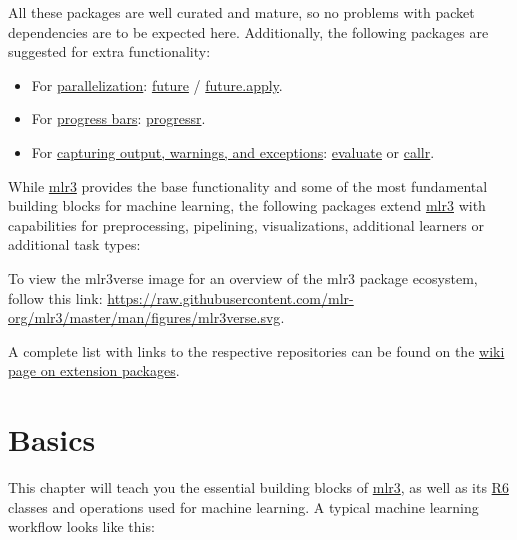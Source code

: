 \documentclass[
]{scrbook}
\providecommand{\tightlist}{%
  \setlength{\itemsep}{0pt}\setlength{\parskip}{0pt}}
\begin{document}
All these packages are well curated and mature, so no problems with packet dependencies are to be expected here.
Additionally, the following packages are suggested for extra functionality:

\begin{itemize}
\tightlist
\item
  For \protect\hyperlink{parallelization}{parallelization}: \href{https://cran.r-project.org/package=future}{future} / \href{https://cran.r-project.org/package=future.apply}{future.apply}.
\item
  For \protect\hyperlink{progress-bars}{progress bars}: \href{https://cran.r-project.org/package=progressr}{progressr}.
\item
  For \protect\hyperlink{error-handling}{capturing output, warnings, and exceptions}: \href{https://cran.r-project.org/package=evaluate}{evaluate} or \href{https://cran.r-project.org/package=callr}{callr}.
\end{itemize}

While \href{https://mlr3.mlr-org.com}{mlr3} provides the base functionality and some of the most fundamental building blocks for machine learning, the following packages extend \href{https://mlr3.mlr-org.com}{mlr3} with capabilities for preprocessing, pipelining, visualizations, additional learners or additional task types:

To view the mlr3verse image for an overview of the mlr3 package ecosystem, follow this link: \url{https://raw.githubusercontent.com/mlr-org/mlr3/master/man/figures/mlr3verse.svg}.

A complete list with links to the respective repositories can be found on the \href{https://github.com/mlr-org/mlr3/wiki/Extension-Packages}{wiki page on extension packages}.

\hypertarget{basics}{%
\chapter{Basics}\label{basics}}

This chapter will teach you the essential building blocks of \href{https://mlr3.mlr-org.com}{mlr3}, as well as its \href{https://cran.r-project.org/package=R6}{R6} classes and operations used for machine learning.
A typical machine learning workflow looks like this:
\end{document}
